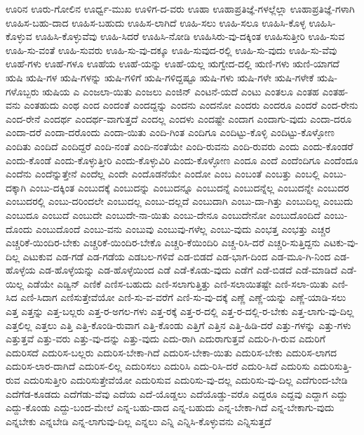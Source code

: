 {ಊರಿನ
ಊರು-ಗೋಲಿನ
ಊರ್ಧ್ವ-ಮುಖ
ಊಳಿಗ-ದ-ವರು
ಊಹಾ
ಊಹಾಪ್ರತಿಜ್ಞೆ-ಗಳಲ್ಲೆಲ್ಲಾ
ಊಹಾಪ್ರತಿಜ್ಞೆ-ಗಳಾಗಿ
ಊಹಿಸ-ಬಹು-ದಾದ
ಊಹಿಸ-ಬಹುದು
ಊಹಿಸ-ಲಾಗಿದೆ
ಊಹಿ-ಸಲು
ಊಹಿ-ಸಲೂ
ಊಹಿಸಿ-ಕೊಳ್ಳ
ಊಹಿಸಿ-ಕೊಳ್ಳುವ
ಊಹಿಸಿ-ಕೊಳ್ಳುವೆವು
ಊಹಿ-ಸಿದರೆ
ಊಹಿಸಿ-ನೋಡಿ
ಊಹಿಸಿರು-ವು-ದಕ್ಕಿಂತ
ಊಹಿಸುತ್ತೀರಿ
ಊಹಿ-ಸುವ
ಊಹಿ-ಸು-ವಂತೆ
ಊಹಿ-ಸುವರು
ಊಹಿ-ಸು-ವು-ದಕ್ಕೂ
ಊಹಿ-ಸುವುದ-ರಲ್ಲಿ
ಊಹಿ-ಸು-ವುದು
ಊಹಿ-ಸು-ವೆವು
ಊಹೆ-ಗಳು
ಊಹೆ-ಗಳೂ
ಊಹೆಯ
ಊಹೆ-ಯನ್ನು
ಊಹೆ-ಯಲ್ಲ
ಋಗ್ವೇದ-ದಲ್ಲಿ
ಋಣಿ-ಗಳು
ಋಣಿ-ಯಾಗದೆ
ಋಷಿ
ಋಷಿ-ಗಳ
ಋಷಿ-ಗಳನ್ನು
ಋಷಿ-ಗಳಿಗೆ
ಋಷಿ-ಗಳಿದ್ದಷ್ಟೂ
ಋಷಿ-ಗಳು
ಋಷಿ-ಗಳೇ
ಋಷಿ-ಗಳೇಕೆ
ಋಷಿ-ಗಳೊಬ್ಬರು
ಋಷಿಯ
ಎ
ಎಂಜಲಾ-ಯಿತು
ಎಂಜಲು
ಎಂಜಿನ್
ಎಂಟನೆ-ಯದೆ
ಎಂಟು
ಎಂತಲೂ
ಎಂತಹ
ಎಂತಹ-ವನು
ಎಂತಹುದು
ಎಂಥ
ಎಂದ
ಎಂದಂತೆ
ಎಂದದ್ದನ್ನು
ಎಂದನು
ಎಂದನೋ
ಎಂದರು
ಎಂದರೂ
ಎಂದರೆ
ಎಂದ-ರೇನು
ಎಂದ-ರೇನೆ
ಎಂದರ್ಥ
ಎಂದರ್ಥ-ವಾಗುತ್ತದೆ
ಎಂದಲ್ಲ
ಎಂದಳು
ಎಂದಷ್ಟೇ
ಎಂದಾಗ
ಎಂದಾಗು-ವುದು
ಎಂದಾ-ದರೂ
ಎಂದಾ-ದರೆ
ಎಂದಾ-ದರೊಂದು
ಎಂದಾ-ಯಿತು
ಎಂದಿ-ಗಿಂತ
ಎಂದಿಗೂ
ಎಂದಿಟ್ಟು-ಕೊಳ್ಳಿ
ಎಂದಿಟ್ಟು-ಕೊಳ್ಳೋಣ
ಎಂದಿತು
ಎಂದಿದೆ
ಎಂದಿದ್ದರೆ
ಎಂದಿ-ನಂತೆ
ಎಂದಿ-ನಂತೆಯೇ
ಎಂದಿ-ರುವನು
ಎಂದಿ-ರುವರು
ಎಂದು
ಎಂದು-ಕೊಂಡರೆ
ಎಂದು-ಕೊಂಡೆ
ಎಂದು-ಕೊಳ್ಳುತ್ತೀರಿ
ಎಂದು-ಕೊಳ್ಳುವಿರಿ
ಎಂದು-ಕೊಳ್ಳೋಣ
ಎಂದೂ
ಎಂದೆ
ಎಂದೆಂದಿಗೂ
ಎಂದೆಂದೂ
ಎಂದೆನು
ಎಂದೆನ್ನುತ್ತೇನೆ
ಎಂದೆಲ್ಲ
ಎಂದೇ
ಎಂದೊಡನೆಯೇ
ಎಂದೋ
ಎಂಬ
ಎಂಬಂತೆ
ಎಂಬತ್ತು
ಎಂಬಲ್ಲಿ
ಎಂಬು-ದಕ್ಕಾಗಿ
ಎಂಬು-ದಕ್ಕಿಂತ
ಎಂಬುದಕ್ಕೆ
ಎಂಬುದನ್ನು
ಎಂಬುದನ್ನೂ
ಎಂಬುದನ್ನೆ
ಎಂಬುದನ್ನೆಲ್ಲ
ಎಂಬುದನ್ನೇ
ಎಂಬುದರ
ಎಂಬುದರಲ್ಲಿ
ಎಂಬು-ದರಿಂದಲೇ
ಎಂಬುದಲ್ಲ
ಎಂಬು-ದಲ್ಲದೆ
ಎಂಬುದಾಗಿ
ಎಂಬು-ದಾ-ಗಿತ್ತು
ಎಂಬುದಿಲ್ಲ
ಎಂಬುದು
ಎಂಬುದೂ
ಎಂಬುದೆ
ಎಂಬುದೇ
ಎಂಬುದೇ-ನಾ-ಯಿತು
ಎಂಬು-ದೇನೂ
ಎಂಬುದೇನೋ
ಎಂಬುದೊಂದಿದೆ
ಎಂಬು-ದೊಂದು
ಎಂಬುದೊಂದೆ
ಎಂಬು-ವನು
ಎಂಬುವು
ಎಂಬುವು-ಗಳೆಲ್ಲ
ಎಂಬು-ವುದು
ಎಂಭತ್ತ
ಎಂಭತ್ತು
ಎಚ್ಚರ
ಎಚ್ಚರಿಕೆ-ಯಿಂದಿರ-ಬೇಕು
ಎಚ್ಚರಿಕೆ-ಯಿಂದಿರ-ಬೇಕೊ
ಎಚ್ಚರಿ-ಕೆಯಿಂದಿರಿ
ಎಚ್ಚ-ರಿಸಿ-ದರೆ
ಎಚ್ಚರಿ-ಸುತ್ತಿದ್ದನು
ಎಟಕು-ವು-ದಿಲ್ಲ
ಎಟುಕುವ
ಎಡ-ಗಡೆ
ಎಡ-ಗಡೆಯ
ಎಡಬಲ-ಗಳಿವೆ
ಎಡ-ಬಿಡದೆ
ಎಡ-ಭಾಗ-ದಿಂದ
ಎಡ-ಮೂ-ಗಿ-ನಿಂದ
ಎಡ-ಹೊಳ್ಳೆಯ
ಎಡ-ಹೊಳ್ಳೆಯನ್ನು
ಎಡ-ಹೊಳ್ಳೆಯಿಂದ
ಎಡೆ
ಎಡೆ-ಕೊಡು-ವುದು
ಎಡೆಗೆ
ಎಡೆ-ಬಿಡದೆ
ಎಡೆ-ಮಾಡಿದೆ
ಎಡೆ-ಯಿಲ್ಲ
ಎಡೆಯೇ
ಎಡ್ವಿನ್
ಎಣಿಕೆ
ಎಣಿಸ-ಬಹುದು
ಎಣಿ-ಸಲಾಗುತ್ತಿತ್ತು
ಎಣಿ-ಸಲಾಯಿತಷ್ಟೇ
ಎಣಿ-ಸಲಾ-ಯಿತು
ಎಣಿ-ಸಿದ
ಎಣಿ-ಸಿದಾಗ
ಎಣಿಸುತ್ತೇವೆಯೋ
ಎಣಿ-ಸು-ವ-ವರೆಗೆ
ಎಣಿ-ಸು-ವು-ದಕ್ಕೆ
ಎಣ್ಣೆ
ಎಣ್ಣೆ-ಯನ್ನು
ಎಣ್ಣೆ-ಯಾಡಿ-ಸಲು
ಎತ್ತ
ಎತ್ತನ್ನು
ಎತ್ತ-ಬಲ್ಲರು
ಎತ್ತ-ರ-ಅಗಲ-ಗಳು
ಎತ್ತ-ರಕ್ಕೆ
ಎತ್ತ-ರ-ದಲ್ಲಿ
ಎತ್ತ-ರ-ದಲ್ಲಿ-ರ-ಬೇಕು
ಎತ್ತ-ಲಾಗು-ವು-ದಿಲ್ಲ
ಎತ್ತಲಿಲ್ಲ
ಎತ್ತಲು
ಎತ್ತಿ
ಎತ್ತಿ-ಕೊಂಡಿ-ರುವಾಗ
ಎತ್ತಿ-ಕೊಂಡು
ಎತ್ತಿಗೆ
ಎತ್ತಿನ
ಎತ್ತಿ-ಹಿಡಿ-ದರೆ
ಎತ್ತು-ಗಳನ್ನು
ಎತ್ತು-ಗಳು
ಎತ್ತುತ್ತವೆ
ಎತ್ತು-ವರು
ಎತ್ತು-ವು-ದನ್ನು
ಎತ್ತು-ವುದು
ಎದು-ರಾಗಿ
ಎದುರಾಗುತ್ತವೆ
ಎದುರಿ-ಗಿ-ರುವ
ಎದುರಿಗೆ
ಎದುರಿಸದೆ
ಎದುರಿಸ-ಬಲ್ಲರು
ಎದುರಿಸ-ಬೇಕಾ-ಗಿದೆ
ಎದುರಿಸ-ಬೇಕಾ-ಯಿತು
ಎದುರಿಸ-ಬೇಕು
ಎದುರಿಸ-ಲಾಗದ
ಎದುರಿಸ-ಲಾರ-ದಾಗಿದೆ
ಎದುರಿಸ-ಲಿಲ್ಲ
ಎದುರಿಸಲು
ಎದುರಿಸಿ
ಎದು-ರಿಸಿ-ದರೆ
ಎದುರಿ-ಸಿದೆ
ಎದುರಿಸು
ಎದುರಿಸುತ್ತಿ-ರುವ
ಎದುರಿಸುತ್ತೀರಿ
ಎದುರಿಸುತ್ತೇವೆಯೋ
ಎದುರಿಸುವ
ಎದುರಿಸು-ವು-ದಲ್ಲ
ಎದುರಿಸು-ವು-ದಿಲ್ಲ
ಎದೆಗುಂದ-ಬೇಡಿ
ಎದೆಗೆಡ-ಕೂಡದು
ಎದೆಗೆಡು-ವೆವು
ಎದೆಯ
ಎದೆ-ಯೊಡ್ಡಲು
ಎದೆಯೊಡ್ಡು-ವರೊ
ಎದ್ದರೂ
ಎದ್ದವು
ಎದ್ದಾಗ
ಎದ್ದು
ಎದ್ದು-ಕೊಂಡು
ಎದ್ದು-ಬಂದ-ಮೇಲೆ
ಎನ್ನ-ಬಹು-ದಾದ
ಎನ್ನ-ಬಹುದು
ಎನ್ನ-ಬೇಕಾ-ಗಿದೆ
ಎನ್ನ-ಬೇಕಾಗು-ವುದು
ಎನ್ನಬೇಕು
ಎನ್ನಬೇಡಿ
ಎನ್ನ-ಲಾಗುವು-ದಿಲ್ಲ
ಎನ್ನಲು
ಎನ್ನಿ
ಎನ್ನಿಸಿ-ಕೊಳ್ಳುವನು
ಎನ್ನಿಸುತ್ತದೆ
}

